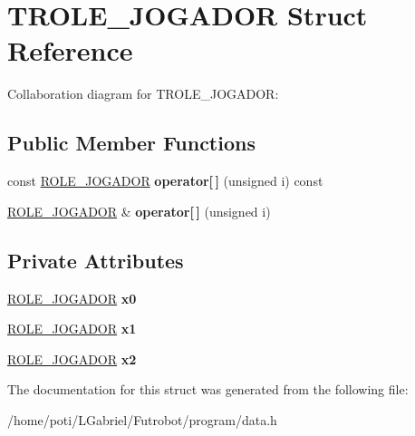 \hypertarget{structTROLE__JOGADOR}{}\section{T\+R\+O\+L\+E\+\_\+\+J\+O\+G\+A\+D\+OR Struct Reference}
\label{structTROLE__JOGADOR}


Collaboration diagram for T\+R\+O\+L\+E\+\_\+\+J\+O\+G\+A\+D\+OR\+:
\subsection*{Public Member Functions}
\begin{DoxyCompactItemize}
\item 
const \hyperlink{structROLE__JOGADOR}{R\+O\+L\+E\+\_\+\+J\+O\+G\+A\+D\+OR} {\bfseries operator\mbox{[}$\,$\mbox{]}} (unsigned i) const \hypertarget{structTROLE__JOGADOR_a9e3f8af9c619d60af55edc1b5f339f15}{}\label{structTROLE__JOGADOR_a9e3f8af9c619d60af55edc1b5f339f15}

\item 
\hyperlink{structROLE__JOGADOR}{R\+O\+L\+E\+\_\+\+J\+O\+G\+A\+D\+OR} \& {\bfseries operator\mbox{[}$\,$\mbox{]}} (unsigned i)\hypertarget{structTROLE__JOGADOR_ad2efbbdc1011cfa89bad2ab53f86c499}{}\label{structTROLE__JOGADOR_ad2efbbdc1011cfa89bad2ab53f86c499}

\end{DoxyCompactItemize}
\subsection*{Private Attributes}
\begin{DoxyCompactItemize}
\item 
\hyperlink{structROLE__JOGADOR}{R\+O\+L\+E\+\_\+\+J\+O\+G\+A\+D\+OR} {\bfseries x0}\hypertarget{structTROLE__JOGADOR_acaaf65d32b8e43e7b64f6586f7eca745}{}\label{structTROLE__JOGADOR_acaaf65d32b8e43e7b64f6586f7eca745}

\item 
\hyperlink{structROLE__JOGADOR}{R\+O\+L\+E\+\_\+\+J\+O\+G\+A\+D\+OR} {\bfseries x1}\hypertarget{structTROLE__JOGADOR_a9b71a30277f4daf0f3f77d46c8bef489}{}\label{structTROLE__JOGADOR_a9b71a30277f4daf0f3f77d46c8bef489}

\item 
\hyperlink{structROLE__JOGADOR}{R\+O\+L\+E\+\_\+\+J\+O\+G\+A\+D\+OR} {\bfseries x2}\hypertarget{structTROLE__JOGADOR_a0ce7bef13518b3aee145ad72301295ea}{}\label{structTROLE__JOGADOR_a0ce7bef13518b3aee145ad72301295ea}

\end{DoxyCompactItemize}


The documentation for this struct was generated from the following file\+:\begin{DoxyCompactItemize}
\item 
/home/poti/\+L\+Gabriel/\+Futrobot/program/data.\+h\end{DoxyCompactItemize}
